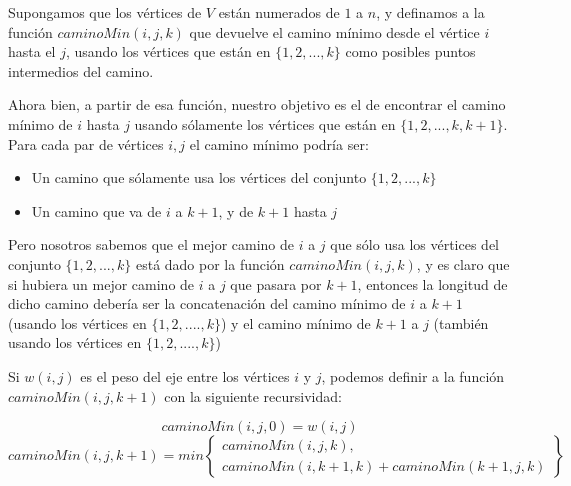 Supongamos que los v\'ertices de $V$ est\'an numerados de $1$ a $n$, y definamos a la funci\'on $caminoMin(i,j,k)$ que devuelve el camino m\'inimo desde el v\'ertice $i$ hasta el $j$, usando los v\'ertices que est\'an en $\{1, 2, ..., k\}$ como posibles puntos intermedios del camino.

Ahora bien, a partir de esa funci\'on, nuestro objetivo es el de encontrar el camino m\'inimo de $i$ hasta $j$ usando s\'olamente los v\'ertices que est\'an en $\{1, 2, ..., k, k+1\}$. Para cada par de v\'ertices $i,j$ el camino m\'inimo podr\'ia ser:

\begin{itemize}
\item Un camino que s\'olamente usa los v\'ertices del conjunto $\{1, 2, ..., k\}$
\item Un camino que va de $i$ a $k+1$, y de $k+1$ hasta $j$
\end{itemize}

Pero nosotros sabemos que el mejor camino de $i$ a $j$ que s\'olo usa los v\'ertices del conjunto $\{1, 2, ..., k\}$ est\'a dado por la funci\'on $caminoMin(i,j,k)$, y es claro que si hubiera un mejor camino de $i$ a $j$ que pasara por $k+1$, entonces la longitud de dicho camino deber\'ia ser la concatenaci\'on del camino m\'inimo de $i$ a $k+1$ (usando los v\'ertices en $\{1, 2, ...., k\}$) y el camino m\'inimo de $k+1$ a $j$ (tambi\'en usando los v\'ertices en $\{1, 2, ...., k\}$)

Si $w(i,j)$ es el peso del eje entre los v\'ertices $i$ y $j$, podemos definir a la funci\'on $caminoMin(i,j,k+1)$ con la siguiente recursividad:

\[
caminoMin(i,j,0) = w(i,j)
\]
\[
caminoMin(i,j,k+1) = min\left\{\begin{array}{lr}
    caminoMin(i,j,k), \\
    caminoMin(i,k+1,k) + caminoMin(k+1, j, k)
    \end{array}\right\}
\]





